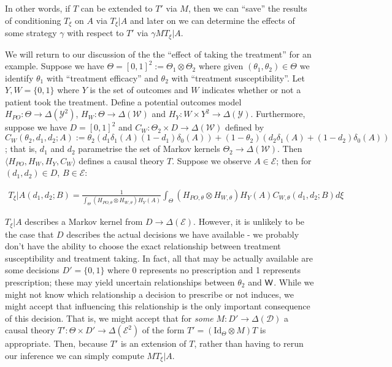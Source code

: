 In other words, if $T$ can be extended to $T'$ via $M$, then we can ``save'' the results of conditioning $T_\xi$ on $A$ via $T_\xi|A$ and later on we can determine the effects of some strategy $\gamma$ with respect to $T'$ via $\gamma M T_\xi|A$.

We will return to our discussion of the the ``effect of taking the treatment'' for an example. Suppose we have $\Theta=[0,1]^2:=\Theta_1\otimes \Theta_2$ where given $(\theta_1,\theta_2)\in\Theta$ we identify $\theta_1$ with ``treatment efficacy'' and $\theta_2$ with ``treatment susceptibility''. Let $Y,W=\{0,1\}$ where $Y$ is the set of outcomes and $W$ indicates whether or not a patient took the treatment. Define a potential outcomes model $H_{PO}:\Theta\to \Delta(\mathcal{Y}^2)$, $H_W:\Theta\to \Delta(\mathcal{W})$ and $H_Y:W\times Y^2\to \Delta(\mathcal{Y})$. Furthermore, suppose we have $D=[0,1]^2$ and $C_W:\Theta_2\times D\to \Delta(\mathcal{W})$ defined by $C_W(\theta_2,d_1,d_2;A):= \theta_2(d_1\delta_1(A) (1-d_1)\delta_0(A)) + (1-\theta_2)(d_2\delta_1(A)+(1-d_2)\delta_0(A))$; that is, $d_1$ and $d_2$ parametrise the set of Markov kernels $\Theta_2\to \Delta(\mathcal{W})$. Then $\langle H_{PO},H_W,H_Y,C_W\rangle$ defines a causal theory $T$. Suppose we observe $A\in \mathcal{E}$; then for $(d_1,d_2)\in D$, $B\in \mathcal{E}$:

\begin{align}
	T_\xi|A (d_1,d_2;B) = \frac{1}{\int_\Theta (H_{PO,\theta}\otimes H_{W,\theta})H_Y(A)}\int_\Theta (H_{PO,\theta}\otimes H_{W,\theta})H_Y(A) C_{W,\theta} (d_1,d_2;B) d\xi
\end{align}

$T_\xi|A$ describes a Markov kernel from $D\to \Delta(\mathcal{E})$. However, it is unlikely to be the case that $D$ describes the actual decisions we have available - we probably don't have the ability to choose the exact relationship between treatment susceptibility and treatment taking. In fact, all that may be actually available are some decisions $D'=\{0,1\}$ where 0 represents no prescription and 1 represents prescription; these may yield uncertain relationships between $\theta_2$ and $\mathsf{W}$. While we might not know which relationship a decision to prescribe or not induces, we might accept that influencing this relationship is the only important consequence of this decision. That is, we might accept that for \emph{some} $M:D'\to \Delta(\mathcal{D})$ a causal theory $T':\Theta\times D'\to \Delta(\mathcal{E}^2)$ of the form $T' = (\mathrm{Id}_\Theta\otimes M)T$ is appropriate. Then, because $T'$ is an extension of $T$, rather than having to rerun our inference we can simply compute $MT_\xi|A$.

